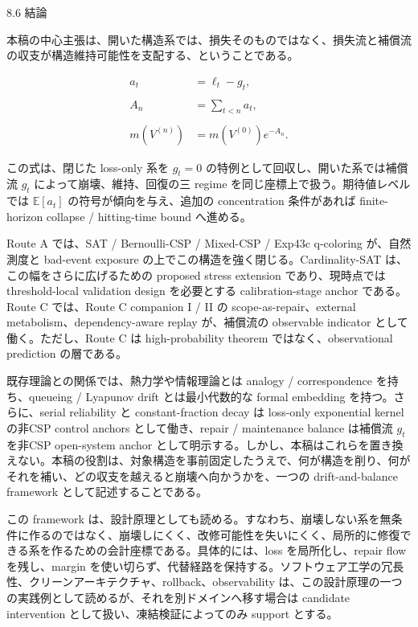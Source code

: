 \documentclass[12pt,a4paper]{article}
\begin{document}
8.6 結論

本稿の中心主張は、開いた構造系では、損失そのものではなく、損失流と補償流の収支が構造維持可能性を支配する、ということである。

\[
\begin{aligned}
a_{t}&=\ell_{t}-g_{t}, \\
\qquad \\
A_{n}&=\sum_{t<n}a_{t}, \\
\qquad \\
m(V^{(n)})&=m(V^{(0)})e^{-A_{n}}.
\end{aligned}
\]

この式は、閉じた loss-only 系を \(g_{t}=0\) の特例として回収し、開いた系では補償流 \(g_{t}\) によって崩壊、維持、回復の三 regime を同じ座標上で扱う。期待値レベルでは \(\mathbb E[a_{t}]\) の符号が傾向を与え、追加の concentration 条件があれば finite-horizon collapse / hitting-time bound へ進める。

Route A では、SAT / Bernoulli-CSP / Mixed-CSP / Exp43c q-coloring が、自然測度と bad-event exposure の上でこの構造を強く閉じる。Cardinality-SAT は、この幅をさらに広げるための proposed stress extension であり、現時点では threshold-local validation design を必要とする calibration-stage anchor である。Route C では、Route C companion I / II の scope-as-repair、external metabolism、dependency-aware replay が、補償流の observable indicator として働く。ただし、Route C は high-probability theorem ではなく、observational prediction の層である。

既存理論との関係では、熱力学や情報理論とは analogy / correspondence を持ち、queueing / Lyapunov drift とは最小代数的な formal embedding を持つ。さらに、serial reliability と constant-fraction decay は loss-only exponential kernel の非CSP control anchors として働き、repair / maintenance balance は補償流 \(g_{t}\) を非CSP open-system anchor として明示する。しかし、本稿はこれらを置き換えない。本稿の役割は、対象構造を事前固定したうえで、何が構造を削り、何がそれを補い、どの収支を越えると崩壊へ向かうかを、一つの drift-and-balance framework として記述することである。

この framework は、設計原理としても読める。すなわち、崩壊しない系を無条件に作るのではなく、崩壊しにくく、改修可能性を失いにくく、局所的に修復できる系を作るための会計座標である。具体的には、loss を局所化し、repair flow を残し、margin を使い切らず、代替経路を保持する。ソフトウェア工学の冗長性、クリーンアーキテクチャ、rollback、observability は、この設計原理の一つの実践例として読めるが、それを別ドメインへ移す場合は candidate intervention として扱い、凍結検証によってのみ support とする。
\end{document}
